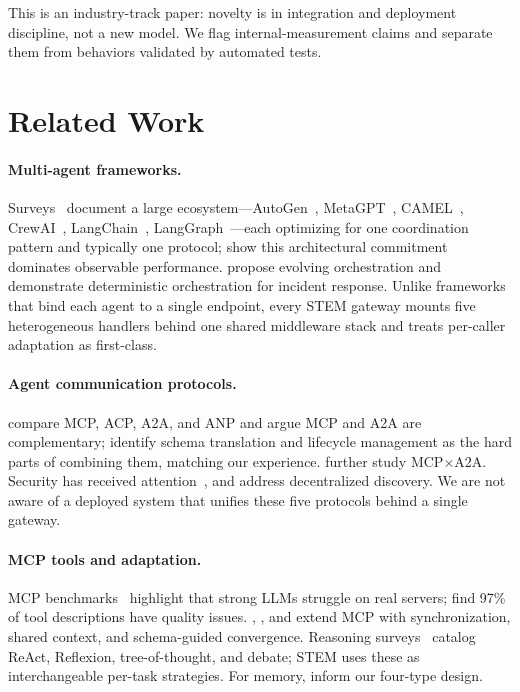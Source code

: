 \documentclass[11pt]{article}
\begin{document}
This is an industry-track paper: novelty is in integration and deployment discipline, not a new model. We flag internal-measurement claims and separate them from behaviors validated by automated tests.

\section{Related Work}
\label{sec:related}

\paragraph{Multi-agent frameworks.}
Surveys~\citep{tran2025multiagent, ferrag2025agents} document a large ecosystem---AutoGen~\citep{wu2023autogen}, MetaGPT~\citep{hong2023metagpt}, CAMEL~\citep{li2023camel}, CrewAI~\citep{crewai2023}, LangChain~\citep{chase2022langchain}, LangGraph~\citep{langgraph2024}---each optimizing for one coordination pattern and typically one protocol; \citet{orogat2026mafbench} show this architectural commitment dominates observable performance. \citet{dang2025evolving} propose evolving orchestration and \citet{drammeh2025orchestration} demonstrate deterministic orchestration for incident response. Unlike frameworks that bind each agent to a single endpoint, every STEM gateway mounts five heterogeneous handlers behind one shared middleware stack and treats per-caller adaptation as first-class.

\paragraph{Agent communication protocols.}
\citet{ehtesham2025survey} compare MCP, ACP, A2A, and ANP and argue MCP and A2A are complementary; \citet{li2025gluetoprotocols} identify schema translation and lifecycle management as the hard parts of combining them, matching our experience. \citet{jeong2025mcpa2a} further study MCP$\times$A2A. Security has received attention~\citep{habler2025a2a, anbiaee2026security, sarkar2025mcpsurvey}, and \citet{chang2025anp} address decentralized discovery. We are not aware of a deployed system that unifies these five protocols behind a single gateway.

\paragraph{MCP tools and adaptation.}
MCP benchmarks~\citep{anthropic2024mcp, luo2025mcpuniverse, fan2025mcptoolbench} highlight that strong LLMs struggle on real servers; \citet{hasan2026mcpsmells} find 97\% of tool descriptions have quality issues. \citet{lumer2025scalemcp}, \citet{jayanti2026enhancing}, and \citet{schlapbach2026convergence} extend MCP with synchronization, shared context, and schema-guided convergence. Reasoning surveys~\citep{wei2026agentic, alomrani2025reasoning, li2025budget} catalog ReAct, Reflexion, tree-of-thought, and debate; STEM uses these as interchangeable per-task strategies. For memory, \citet{ai2025memorybench, gallego2026memoryastool, yadav2026synapse} inform our four-type design.
\end{document}
